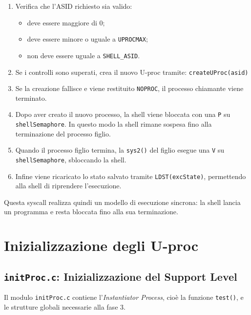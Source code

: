 \documentclass[a4paper,12pt]{article}
\begin{document}
\begin{enumerate}
\begin{enumerate}
    \item Verifica che l'ASID richiesto sia valido:
    \begin{itemize}
        \item deve essere maggiore di 0;
        \item deve essere minore o uguale a \texttt{UPROCMAX};
        \item non deve essere uguale a \texttt{SHELL\_ASID}.
    \end{itemize}

    \item Se i controlli sono superati, crea il nuovo U-proc tramite: \texttt{createUProc(asid)}


    \item Se la creazione fallisce e viene restituito \texttt{NOPROC}, il processo chiamante viene terminato.

    \item Dopo aver creato il nuovo processo, la shell viene bloccata con una \texttt{P} su \texttt{shellSemaphore}. In questo modo la shell rimane sospesa fino alla terminazione del processo figlio.

    \item Quando il processo figlio termina, la \texttt{sys2()} del figlio esegue una \texttt{V} su \texttt{shellSemaphore}, sbloccando la shell.

    \item Infine viene ricaricato lo stato salvato tramite \texttt{LDST(excState)}, permettendo alla shell di riprendere l'esecuzione.
\end{enumerate}

Questa syscall realizza quindi un modello di esecuzione sincrona: la shell lancia un programma e resta bloccata fino alla sua terminazione.


\section{Inizializzazione degli U-proc}
\vspace{0.5cm}
\subsection{\texttt{initProc.c}: Inizializzazione del Support Level}

Il modulo \texttt{initProc.c} contiene l'\textit{Instantiator Process}, cioè la funzione \texttt{test()}, e le strutture globali necessarie alla fase 3.

\vspace{0.3cm}

\end{enumerate}
\end{document}
